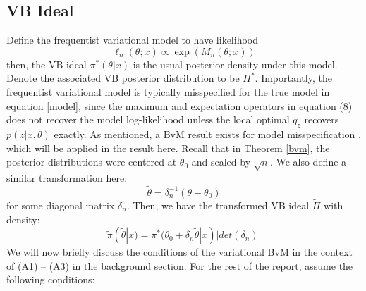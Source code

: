 \subsection{VB Ideal}
Define the frequentist variational model to have likelihood
\begin{equation}
\ell_n(\theta; x) \propto \exp(M_n(\theta;x))
\end{equation}
then, the VB ideal $\pi^*(\theta|x)$ is the usual posterior density under this model. Denote the associated VB posterior distribution to be $\Pi^*$. Importantly, the frequentist variational model is typically misspecified for the true model in equation \ref{model}, since the maximum and expectation operators in equation (8) does not recover the model log-likelihood unless the local optimal $q_z$ recovers $p(z|x, \theta)$ exactly. As mentioned, a BvM result exists for model misspecification \cite{kleijn2012}, which will be applied in the result here. Recall that in Theorem \ref{bvm}, the posterior distributions were centered at $\theta_0$ and scaled by $\sqrt{n}$. We also define a similar transformation here:
\begin{equation}
\tilde{\theta} = \delta_n^{-1}(\theta - \theta_0) 
\end{equation}
for some diagonal matrix $\delta_n$. Then, we have the transformed VB ideal $\tilde{\Pi}$ with density:
\begin{equation}
\tilde{\pi}(\tilde{\theta}|x) = \pi^*(\theta_0 + \delta_n\tilde{\theta}|x) |det(\delta_n)|
\end{equation}
We will now briefly discuss the conditions of the variational BvM in the context of (A1) -- (A3) in the background section. For the rest of the report, assume the following conditions:

